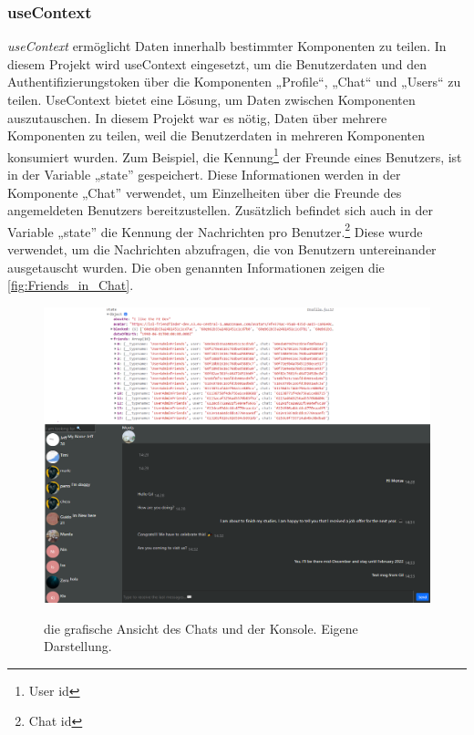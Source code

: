 \subsubsection*{useContext}
\textit{useContext} ermöglicht Daten innerhalb bestimmter Komponenten zu teilen. In diesem Projekt wird useContext eingesetzt, um die Benutzerdaten und den Authentifizierungstoken über die Komponenten  „Profile“, „Chat“ und „Users“ zu teilen. UseContext bietet eine Lösung, um Daten zwischen Komponenten auszutauschen{\cite{R04}}.
\newpage
In diesem Projekt war es nötig, Daten über mehrere Komponenten zu teilen, weil die Benutzerdaten in mehreren Komponenten konsumiert wurden. Zum Beispiel, die Kennung\footnote{User id} der Freunde eines Benutzers, ist in der Variable „state” gespeichert. Diese Informationen werden in der Komponente „Chat” verwendet, um Einzelheiten über die Freunde des angemeldeten Benutzers bereitzustellen. Zusätzlich befindet sich auch in der Variable „state” die Kennung der Nachrichten pro Benutzer.\footnote{Chat id} Diese wurde verwendet, um die Nachrichten abzufragen, die von Benutzern untereinander ausgetauscht wurden. 
Die oben genannten Informationen zeigen die \autoref{fig:Friends_in_Chat}.
\begin{figure}[h!]
  \centering
  \includegraphics[scale=0.43]{sources/Friends_in_Chat}
  \caption[Einzelheiten der Freunde]{}
  \label{fig:Friends_in_Chat} 
  die grafische Ansicht des Chats und der Konsole. Eigene Darstellung.
\end{figure} 
